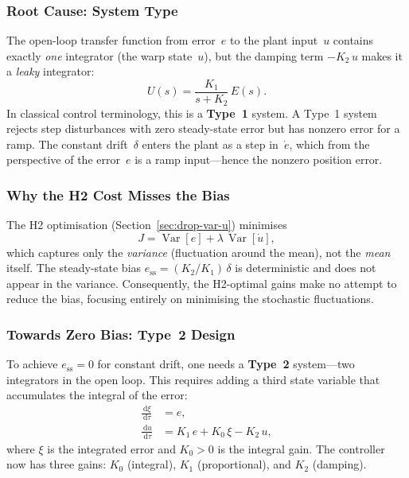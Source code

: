 \documentclass[11pt, a4paper]{article}
\theoremstyle{definition}
\theoremstyle{plain}
\theoremstyle{remark}
\newcommand{\Var}{\operatorname{Var}}
\newcommand{\dd}{\,\mathrm{d}}                   %
\begin{document}
\subsubsection{Root Cause: System Type}

The open-loop transfer function from
error~$e$ to the plant input~$u$ contains exactly \emph{one}
integrator (the warp state~$u$), but the damping term
$-K_2\,u$ makes it a \emph{leaky} integrator:
\begin{equation}
  U(s) = \frac{K_1}{s + K_2}\,E(s).
\end{equation}
In classical control terminology, this is a \textbf{Type~1} system.
A Type~1 system rejects step disturbances with zero steady-state
error but has nonzero error for a ramp.  The constant drift~$\delta$
enters the plant as a step in~$\dot{e}$, which from the perspective
of the error~$e$ is a ramp input---hence the nonzero
position error.

\subsubsection{Why the H2 Cost Misses the Bias}

The H2 optimisation (Section~\ref{sec:drop-var-u}) minimises
\begin{equation}
  J = \Var[e] + \lambda\,\Var[\dot{u}],
\end{equation}
which captures only the \emph{variance} (fluctuation around the
mean), not the \emph{mean} itself.  The steady-state bias
$e_{\text{ss}} = (K_2/K_1)\,\delta$ is deterministic and does not
appear in the variance.  Consequently, the H2-optimal gains make no
attempt to reduce the bias, focusing entirely on minimising the
stochastic fluctuations.

\subsubsection{Towards Zero Bias: Type~2 Design}

To achieve $e_{\text{ss}} = 0$ for constant drift, one needs a
\textbf{Type~2} system---two integrators in the open loop.  This
requires adding a third state variable that accumulates the
integral of the error:
\begin{align}
  \frac{\dd \xi}{\dd\tau} &= e, \label{eq:type2-xi}\\[4pt]
  \frac{\dd u}{\dd\tau} &= K_1\,e + K_0\,\xi - K_2\,u,
    \label{eq:type2-u}
\end{align}
where $\xi$ is the integrated error and $K_0 > 0$ is the integral
gain.  The controller now has three gains: $K_0$ (integral),
$K_1$ (proportional), and $K_2$ (damping).
\end{document}
